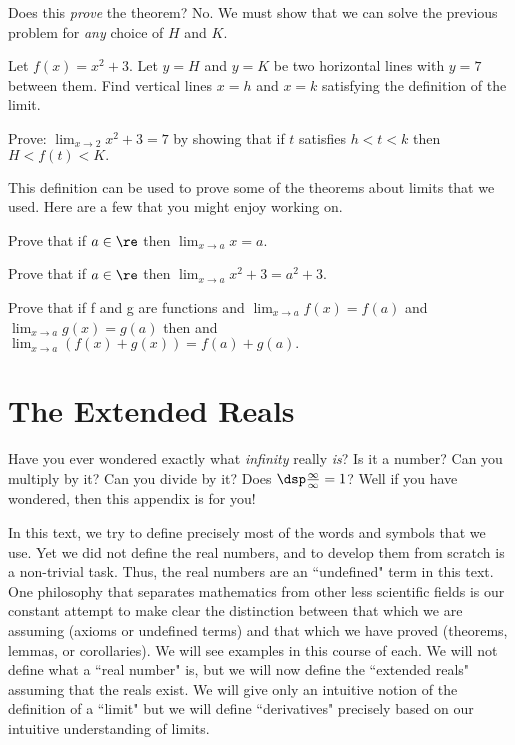 Does this {\it prove} the theorem?  No.  We must show that we can solve the previous problem for {\it any} choice of $H$ and $K$.

\begin{prb}
Let $f(x) = x^2 + 3.$ Let $y=H$ and $y=K$ be two horizontal lines with $y=7$ between them. Find vertical lines $x=h$ and $x=k$ satisfying the definition of the limit.
\end{prb}

\begin{prb}
Prove: $\lim_{x \rightarrow 2} x^2 + 3 = 7$ by showing that if $t$ satisfies $h < t < k$ then $H < f(t) < K.$
\end{prb}

This definition can be used to prove some of the theorems about limits that we used. Here are a few that you might enjoy working on.

\begin{prb}
Prove that if $a \in \re$ then $\lim_{x \rightarrow a} x = a.$
\end{prb}

\begin{prb}
Prove that if $a \in \re$ then $\lim_{x \rightarrow a} x^2 + 3 = a^2 + 3.$
\end{prb}

\begin{prb}
Prove that if f and g are functions and $\lim_{x \rightarrow a} f(x) = f(a)$ and $\lim_{x \rightarrow a} g(x) = g(a)$ then and $\lim_{x \rightarrow a} \left( f(x) + g(x) \right)  = f(a) + g(a).$
\end{prb}

\section{The Extended Reals} \label{appreal}

\setcounter{dfn}{0}
\setcounter{prb}{0}
\setcounter{axm}{0}
\setcounter{expl}{0}
\setcounter{lem}{0}
\setcounter{thm}{0}

Have you ever wondered exactly what {\it infinity} really {\it is}? Is it a number?  Can you multiply by it?  Can you divide by it?  Does $\dsp \frac{\infty}{\infty} = 1$?  Well if you have wondered, then this appendix is for you!

In this text, we try to define precisely most of the words and symbols that we use.  Yet we did not define the real numbers, and to develop them from scratch is a non-trivial task.  Thus, the real numbers are an ``undefined" term in this text.  One philosophy that separates mathematics from other less scientific fields is our constant attempt to make clear the distinction between that which we are assuming (axioms or undefined terms) and that which we have proved (theorems, lemmas, or corollaries). We will see examples in this course of each.  We will not define what a ``real number" is, but we will now define the ``extended reals" assuming that the reals exist.  We will give only an intuitive notion of the definition of a ``limit" but we will define ``derivatives" precisely based on our intuitive understanding of limits.

